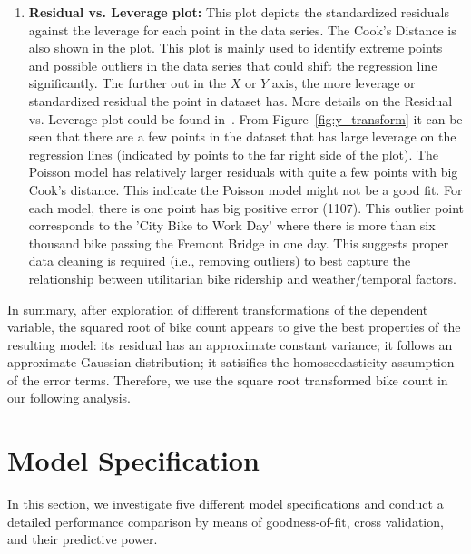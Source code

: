 \documentclass [11pt, proquest] {uwthesis}[2015/03/03]
\begin{document}
\begin{enumerate}
\item \textbf{Residual vs. Leverage plot:} This plot depicts the standardized residuals against the leverage for each point in the data series. The Cook's Distance is also shown in the plot. This plot is mainly used to identify extreme points and possible outliers in the data series that could shift the regression line significantly. The further out in the $X$ or $Y$ axis, the more leverage or standardized residual the point in dataset has. More details on the Residual vs. Leverage plot could be found in~\cite{gung13}. From Figure~\ref{fig:y_transform} it can be seen that there are a few points in the dataset that has large leverage on the regression lines (indicated by points to the far right side of the plot). The Poisson model has relatively larger residuals with quite a few points with big Cook's distance. This indicate the Poisson model might not be a good fit. For each model, there is one point has big positive error (1107). This outlier point corresponds to the 'City Bike to Work Day' where there is more than six thousand bike passing the Fremont Bridge in one day. This suggests proper data cleaning is required (i.e., removing outliers) to best capture the relationship between utilitarian bike ridership and weather/temporal factors. 
\end{enumerate}
In summary, after exploration of different transformations of the dependent variable, the squared root of bike count appears to give the best properties of the resulting model: its residual has an approximate constant variance; it follows an approximate Gaussian distribution; it satisifies the homoscedasticity assumption of the error terms. Therefore, we use the square root transformed bike count in our following analysis. 

\newpage
\thispagestyle{empty}
\mbox{}

\section{Model Specification}

In this section, we investigate five different model specifications and conduct a detailed performance comparison by means of goodness-of-fit, cross validation, and their predictive power. 
\end{document}
